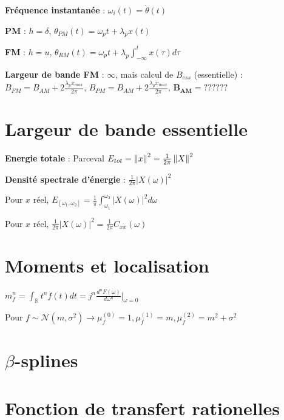 \textbf{Fréquence instantanée} : $\omega_i(t) = \dot \theta(t)$

\textbf{PM} : $h=\delta$, $\theta_{PM}(t) = \omega_pt + \lambda_p x(t)$

\textbf{FM} : $h=u$, $\theta_{RM}(t) = \omega_pt + \lambda_p \int_{-\infty}^t x(\tau)d\tau$

\textbf{Largeur de bande FM} : $\infty$, mais calcul de $B_{ess}$ (essentielle) :  $B_{FM} = B_{AM} + 2 \frac{\lambda_p x_{max}}{2\pi}$, $B_{PM} = B_{AM} + 2 \frac{\lambda_p \dot x_{max}}{2\pi}$, $\mathbf{B_{AM}} = ??????$



\section{Largeur de bande essentielle}

\textbf{Energie totale} : Parceval $E_{tot} = \left\lVert x\right\rVert^2 = \frac{1}{2\pi} \left\lVert X\right\rVert^2$

\textbf{Densité spectrale d'énergie} : $\frac{1}{2\pi} |X(\omega)|^2$

Pour $x$ réel, $E_{[\omega_1,\omega_2]} = \frac{1}{\pi} \int_{\omega_1}^{\omega_2} |X(\omega)|^2 d\omega$

Pour $x$ réel, $\frac{1}{2\pi} |X(\omega)|^2 = \frac{1}{2\pi} C_{xx}(\omega)$



\section{Moments et localisation}

$m_f^n = \int_\mathbb{R} t^n f(t)dt = j^n \frac{d^nF(\omega)}{d\omega^n} \rvert_{\omega=0}$

Pour $f \sim \mathcal{N}(m, \sigma^2) \rightarrow \mu_f^{(0)} = 1, \mu_f^{(1)} = m, \mu_f^{(2)} = m^2+\sigma^2$



\section{$\beta$-splines}



\section{Fonction de transfert rationelles}

